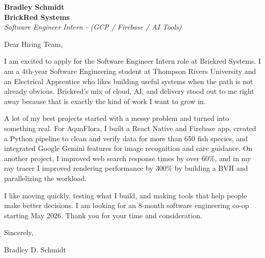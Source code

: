 \documentclass[11pt]{article}
\begin{document}
\textbf{Bradley Schmidt}\\
\vspace{0.5em}
\textbf{BrickRed Systems}\\
\textit{Software Engineer Intern - (GCP / Firebase / AI Tools)}

Dear Hiring Team,

\par

I am excited to apply for the Software Engineer Intern role at Brickred Systems. I am a 4th-year Software Engineering student at Thompson Rivers University and an Electrical Apprentice who likes building useful systems when the path is not already obvious. Brickred’s mix of cloud, AI, and delivery stood out to me right away because that is exactly the kind of work I want to grow in.

\par

A lot of my best projects started with a messy problem and turned into something real. For AquaFlora, I built a React Native and Firebase app, created a Python pipeline to clean and verify data for more than 650 fish species, and integrated Google Gemini features for image recognition and care guidance. On another project, I improved web search response times by over 60\%, and in my ray tracer I improved rendering performance by 300\% by building a BVH and parallelizing the workload.

\par

I like moving quickly, testing what I build, and making tools that help people make better decisions. I am looking for an 8-month software engineering co-op starting May 2026. Thank you for your time and consideration.

\par

Sincerely,

\par

Bradley D. Schmidt
\end{document}
